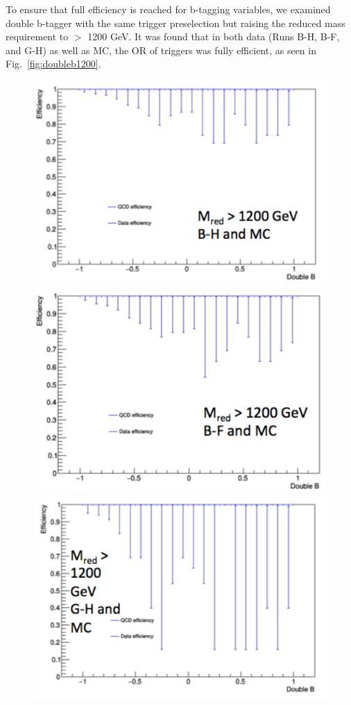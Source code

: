 To ensure that full efficiency is reached for b-tagging variables, we examined double b-tagger with the same trigger preselection but raising the reduced mass requirement to $>$ 1200 GeV. It was found that in both data (Runs B-H, B-F, and G-H) as well as MC, the OR of triggers was fully efficient, as seen in Fig.~\ref{fig:doubleb1200}.

\begin{figure}[thb!]
\begin{center}
\includegraphics[scale=0.35]{Figures/doubleB1200BH.pdf}\\
\includegraphics[scale=0.35]{Figures/doubleB1200BF.pdf}
\includegraphics[scale=0.35]{Figures/doubleB1200GH.pdf}

\end{center}
\end{figure}

